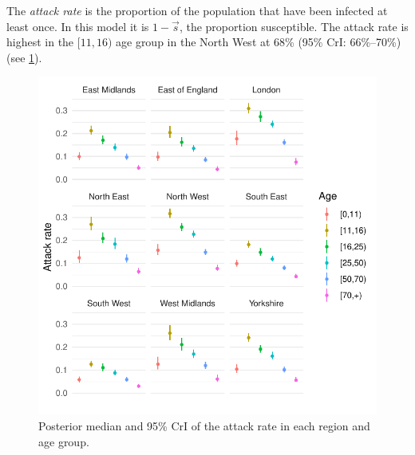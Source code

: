 \documentclass[thesis.tex]{subfiles}
\begin{document}
The \emph{attack rate} is the proportion of the population that have been infected at least once.
In this model it is $1 - \vec{s}$, the proportion susceptible.
The attack rate is highest in the $[11, 16)$ age group in the North West at 68\% (95\% CrI: 66\%--70\%) (see \cref{SEIR:fig:attack-rates}).
\begin{figure}
    \includegraphics{SEIR/CIS/attack_rates}
    \caption{Posterior median and 95\% CrI of the attack rate in each region and age group.}
    \label{SEIR:fig:attack-rates}
\end{figure}
\end{document}

